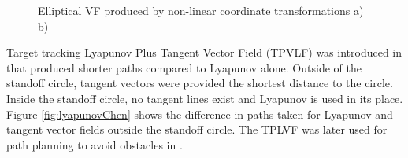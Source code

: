 \documentclass[numbered,pdftex]{ohio-etd}
\begin{document}
\begin{figure}[h]
	\begin{subfigmatrix}{2}%
		\centering
	\end{subfigmatrix}
	\caption{Elliptical VF produced by non-linear coordinate transformations a)\cite{frew_lyapunov_nodate} b)\cite{frew_cooperative_2007}}
	\label{fig:lyapunovFrew}
\end{figure}

Target tracking Lyapunov Plus Tangent Vector Field (TPVLF) was introduced in \cite{chen_tracking_2009} that produced shorter paths compared to Lyapunov alone. Outside of the standoff circle, tangent vectors were provided the shortest distance to the circle. Inside the standoff circle, no tangent lines exist and Lyapunov is used in its place. Figure \ref{fig:lyapunovChen} shows the difference in paths taken for Lyapunov and tangent vector fields outside the standoff circle. The TPLVF was later used for path planning to avoid obstacles in \cite{chen_uav_2013}.
\end{document}

